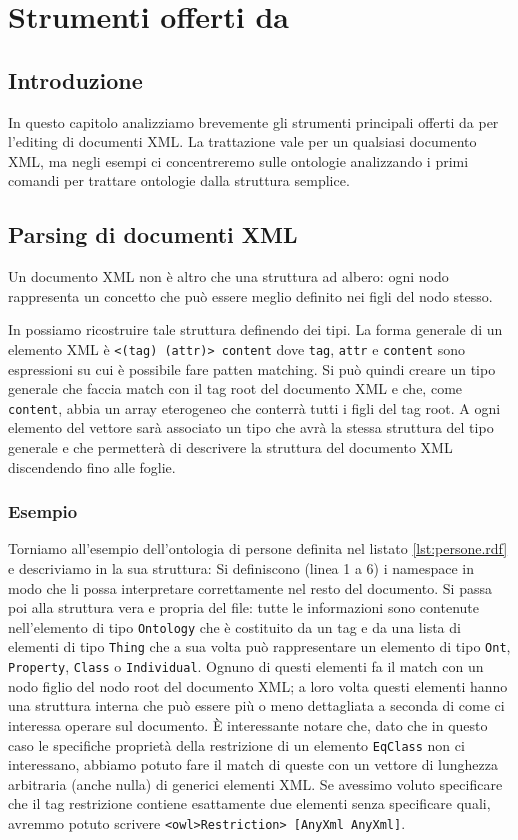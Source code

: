 \chapter{Strumenti offerti da \cduce}\label{ch2}
\section{Introduzione}
In questo capitolo analizziamo brevemente gli strumenti principali offerti da \cduce per l'editing di documenti XML. La trattazione vale per un qualsiasi documento XML, ma negli esempi ci concentreremo sulle ontologie analizzando i primi comandi per trattare ontologie dalla struttura semplice. 


\section{Parsing di documenti XML}
Un documento XML non è altro che una struttura ad albero: ogni nodo rappresenta un concetto che può essere meglio definito nei figli del nodo stesso. 

In \cduce possiamo ricostruire tale struttura definendo dei tipi. La forma generale di un elemento XML è \verb|<(tag) (attr)> content| dove \verb|tag|, \verb|attr| e \verb|content| sono espressioni su cui è possibile fare patten matching. Si può quindi creare un tipo generale che faccia match con il tag root del documento XML e che, come \verb|content|, abbia un array eterogeneo che conterrà tutti i figli del tag root. A ogni elemento del vettore sarà associato un tipo che avrà la stessa struttura del tipo generale e che permetterà di descrivere la struttura del documento XML discendendo fino alle foglie.
\subsection{Esempio}
Torniamo all'esempio dell'ontologia di persone definita nel listato \ref{lst:persone.rdf} e descriviamo in \cduce la sua struttura:
Si definiscono (linea 1 a 6) i namespace in modo che \cduce li possa interpretare correttamente nel resto del documento. Si passa poi alla struttura vera e propria del file: tutte le informazioni sono contenute nell'elemento di tipo \verb|Ontology| che è costituito da un tag e da una lista di elementi di tipo \verb|Thing| che a sua volta può rappresentare un elemento di tipo \verb|Ont|, \verb|Property|, \verb|Class| o \verb|Individual|. Ognuno di questi elementi fa il match con un nodo figlio del nodo root del documento XML; a loro volta questi elementi hanno una struttura interna che può essere più o meno dettagliata a seconda di come ci interessa operare sul documento. È interessante notare che, dato che in questo caso le specifiche proprietà della restrizione di un elemento \verb|EqClass| non ci interessano, abbiamo potuto fare il match di queste con un vettore di lunghezza arbitraria (anche nulla) di generici elementi XML. Se avessimo voluto specificare che il tag restrizione contiene esattamente due elementi senza specificare quali, avremmo potuto scrivere \verb|<owl>Restriction> [AnyXml AnyXml]|.

